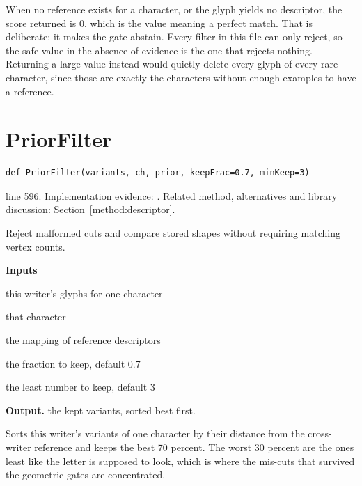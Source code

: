 When no reference exists for a character, or the glyph yields no descriptor, the score returned is 0, which is the value meaning a perfect match. That is deliberate: it makes the gate abstain. Every filter in this file can only reject, so the safe value in the absence of evidence is the one that rejects nothing. Returning a large value instead would quietly delete every glyph of every rare character, since those are exactly the characters without enough examples to have a reference.



\section{PriorFilter}\label{fn:style:PriorFilter}
\begin{lstlisting}[style=sig]
def PriorFilter(variants, ch, prior, keepFrac=0.7, minKeep=3)
\end{lstlisting}
 line 596. Implementation evidence: \cite{code2026}. Related method, alternatives and library discussion: Section~\ref{method:descriptor}.


Reject malformed cuts and compare stored shapes without requiring matching vertex counts.




\noindent\textbf{Inputs}
\begin{description}[leftmargin=2.2em,style=nextline,font=\normalfont\ttfamily]\setlength\itemsep{1pt}
  \item[{variants}] \normalfont this writer's glyphs for one character
  \item[{ch}] \normalfont that character
  \item[{prior}] \normalfont the mapping of reference descriptors
  \item[{keepFrac}] \normalfont the fraction to keep, default 0.7
  \item[{minKeep}] \normalfont the least number to keep, default 3
\end{description}

\noindent\textbf{Output.} the kept variants, sorted best first.


Sorts this writer's variants of one character by their distance from the cross-writer reference and keeps the best 70 percent. The worst 30 percent are the ones least like the letter is supposed to look, which is where the mis-cuts that survived the geometric gates are concentrated.


